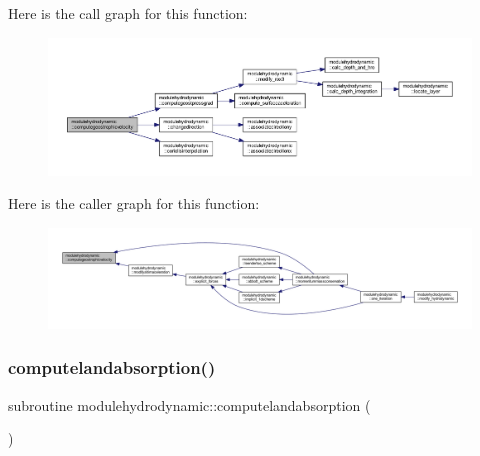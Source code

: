 Here is the call graph for this function\+:\nopagebreak
\begin{figure}[H]
\begin{center}
\leavevmode
\includegraphics[width=350pt]{namespacemodulehydrodynamic_a63098393e35b164bc5c6885e1473058f_cgraph}
\end{center}
\end{figure}
Here is the caller graph for this function\+:\nopagebreak
\begin{figure}[H]
\begin{center}
\leavevmode
\includegraphics[width=350pt]{namespacemodulehydrodynamic_a63098393e35b164bc5c6885e1473058f_icgraph}
\end{center}
\end{figure}
\mbox{\label{namespacemodulehydrodynamic_a2cc7d18aae53734d8068f7a35a0fd029}} 
\subsubsection{\texorpdfstring{computelandabsorption()}{computelandabsorption()}}
{\footnotesize\ttfamily subroutine modulehydrodynamic\+::computelandabsorption (\begin{DoxyParamCaption}{ }\end{DoxyParamCaption})\hspace{0.3cm}{\ttfamily [private]}}

